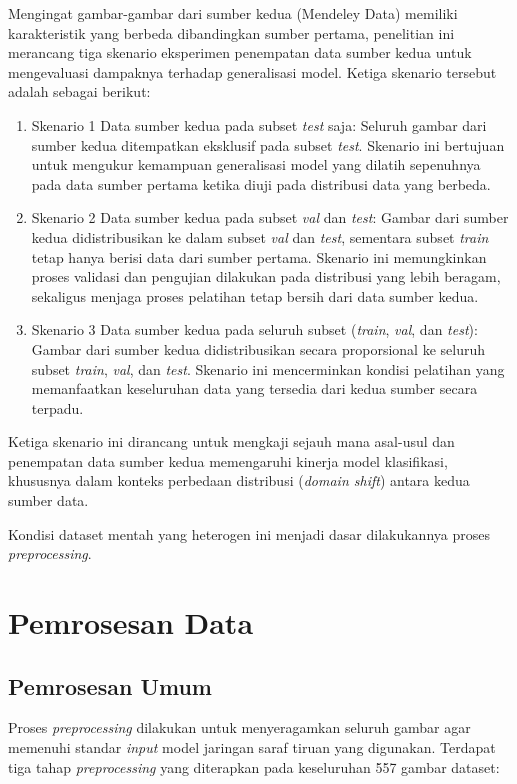 Mengingat gambar-gambar dari sumber kedua (Mendeley Data) memiliki karakteristik yang berbeda dibandingkan sumber pertama, penelitian ini merancang tiga skenario eksperimen penempatan data sumber kedua untuk mengevaluasi dampaknya terhadap generalisasi model. Ketiga skenario tersebut adalah sebagai berikut:
\begin{enumerate}
	\item Skenario 1
	Data sumber kedua pada subset \textit{test} saja: Seluruh gambar dari sumber kedua ditempatkan eksklusif pada subset \textit{test}. Skenario ini bertujuan untuk mengukur kemampuan generalisasi model yang dilatih sepenuhnya pada data sumber pertama ketika diuji pada distribusi data yang berbeda.
	
	\item Skenario 2
	Data sumber kedua pada subset \textit{val} dan \textit{test}: Gambar dari sumber kedua didistribusikan ke dalam subset \textit{val} dan \textit{test}, sementara subset \textit{train} tetap hanya berisi data dari sumber pertama. Skenario ini memungkinkan proses validasi dan pengujian dilakukan pada distribusi yang lebih beragam, sekaligus menjaga proses pelatihan tetap bersih dari data sumber kedua.
	
	\item Skenario 3
	Data sumber kedua pada seluruh subset (\textit{train}, \textit{val}, dan \textit{test}): Gambar dari sumber kedua didistribusikan secara proporsional ke seluruh subset \textit{train}, \textit{val}, dan \textit{test}. Skenario ini mencerminkan kondisi pelatihan yang memanfaatkan keseluruhan data yang tersedia dari kedua sumber secara terpadu.
\end{enumerate}
Ketiga skenario ini dirancang untuk mengkaji sejauh mana asal-usul dan penempatan data sumber kedua memengaruhi kinerja model klasifikasi, khususnya dalam konteks perbedaan distribusi (\textit{domain shift}) antara kedua sumber data.

Kondisi dataset mentah yang heterogen ini menjadi dasar dilakukannya proses \textit{preprocessing}.

\section{Pemrosesan Data}

\subsection{Pemrosesan Umum}
Proses \textit{preprocessing} dilakukan untuk menyeragamkan seluruh gambar agar memenuhi standar \textit{input} model jaringan saraf tiruan yang digunakan. Terdapat tiga tahap \textit{preprocessing} yang diterapkan pada keseluruhan 557 gambar dataset:

